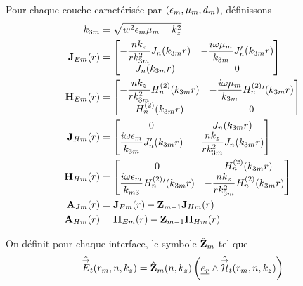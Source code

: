         \begin{defn}
            Pour chaque couche caractérisée par \((\epsilon_m,\mu_m,d_m)\), définissons
            \begin{subequations}
                \begin{align}
                    k_{3m} &= \sqrt{w^2\epsilon_m\mu_m - k_z^2}
                    \\
                    \mathbf{J}_{Em}(r) &= 
                        \begin{bmatrix}
                            -\dfrac{nk_z}{rk_{3m}^2}J_n(k_{3m}r) & -\dfrac{i\omega\mu_m}{k_{3m}}J_n'(k_{3m}r)
                            \\
                            J_n(k_{3m}r) & 0
                        \end{bmatrix}
                    \\
                    \mathbf{H}_{Em}(r) &= 
                        \begin{bmatrix}
                            -\dfrac{nk_z}{rk_{3m}^2}H_n^{(2)}(k_{3m}r) & -\dfrac{i\omega\mu_m}{k_{3m}}H_n^{(2)}{}'(k_{3m}r)
                            \\
                            H_n^{(2)}(k_{3m}r) & 0
                        \end{bmatrix}
                    \\
                    \mathbf{J}_{Hm}(r) &= 
                        \begin{bmatrix}
                            0 & -J_n(k_{3m}r)
                            \\
                            \dfrac{i\omega\epsilon_m}{k_{3m}}J_n'(k_{3m}r) & -\dfrac{nk_z}{rk_{3m}^2}J_n(k_{3m}r)
                        \end{bmatrix}
                    \\
                    \mathbf{H}_{Hm}(r) &= 
                        \begin{bmatrix}
                            0 & -H_n^{(2)}(k_{3m}r)
                            \\
                            \dfrac{i\omega\epsilon_m}{k_{m3}}H_n^{(2)}{}'(k_{3m}r) & -\dfrac{nk_z}{rk_{3m}^2}H_n^{(2)}(k_{3m}r)
                        \end{bmatrix}
                    \\
                    \mathbf{A}_{Jm}(r) &= \mathbf{J}_{Em}(r) -  \mathbf{Z}_{m-1} \mathbf{J}_{Hm}(r)
                    \\
                    \mathbf{A}_{Hm}(r) &= \mathbf{H}_{Em}(r) -  \mathbf{Z}_{m-1} \mathbf{H}_{Hm}(r)
                \end{align}
            \end{subequations}

            On définit pour chaque interface, le symbole \(\hat {\mathbf{Z}}_m\) tel que 
            \begin{equation}
                \hat {{\overset{\rightarrow}{E}}}_t(r_m,n,k_z) = \hat {\mathbf{Z}}_m(n,k_z) \left(\underline{e_r} \wedge \hat {{\overset{\rightarrow}{\mathcal{H}}}}_t(r_m,n,k_z)\right)
            \end{equation}
        \end{defn}


